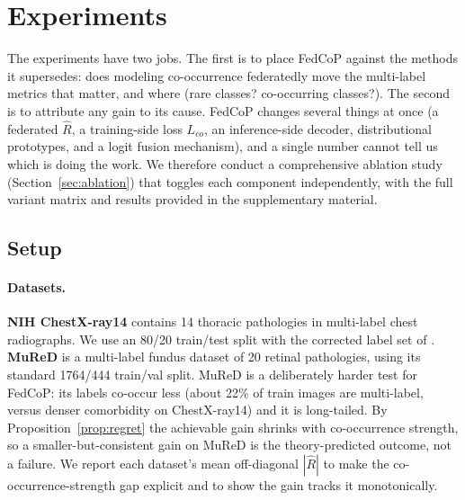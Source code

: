 \documentclass[11pt,a4paper]{article}
\theoremstyle{definition}
\newcommand{\Rhat}{\widehat{R}}
\begin{document}
\section{Experiments}
\label{sec:experiments}

The experiments have two jobs. The first is to place FedCoP against the methods it supersedes: does modeling co-occurrence federatedly move the multi-label metrics that matter, and where (rare classes? co-occurring classes?). The second is to attribute any gain to its cause. FedCoP changes several things at once (a federated $\Rhat$, a training-side loss $L_{co}$, an inference-side decoder, distributional prototypes, and a logit fusion mechanism), and a single number cannot tell us which is doing the work. We therefore conduct a comprehensive ablation study (Section~\ref{sec:ablation}) that toggles each component independently, with the full variant matrix and results provided in the supplementary material.

\subsection{Setup}
\label{sec:setup}

\paragraph{Datasets.} \textbf{NIH ChestX-ray14} \citep{wang2017chestxray8,jaeger2023chestxray} contains 14 thoracic pathologies in multi-label chest radiographs. We use an 80/20 train/test split with the corrected label set of \citep{jaeger2023chestxray}. \textbf{MuReD} \citep{caro2022mured} is a multi-label fundus dataset of 20 retinal pathologies, using its standard 1764/444 train/val split. MuReD is a deliberately harder test for FedCoP: its labels co-occur less (about 22\% of train images are multi-label, versus denser comorbidity on ChestX-ray14) and it is long-tailed. By Proposition~\ref{prop:regret} the achievable gain shrinks with co-occurrence strength, so a smaller-but-consistent gain on MuReD is the theory-predicted outcome, not a failure. We report each dataset's mean off-diagonal $|\Rhat|$ to make the co-occurrence-strength gap explicit and to show the gain tracks it monotonically.
\end{document}
